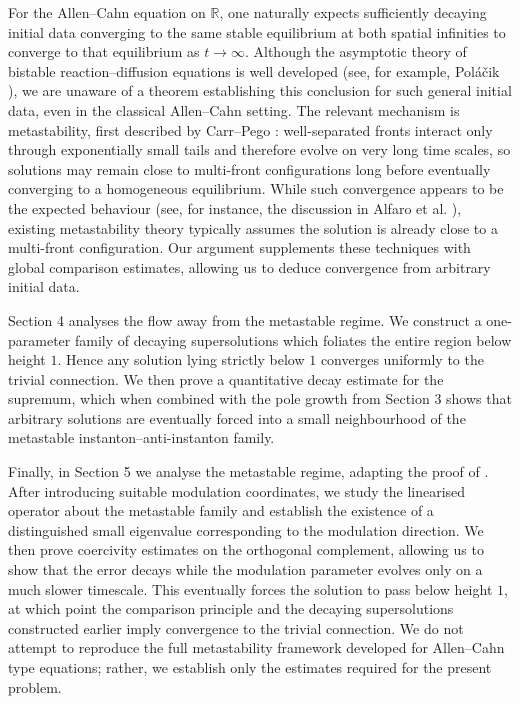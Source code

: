 \documentclass[11pt,a4paper]{article}
\numberwithin{equation}{section}
\theoremstyle{plain}
\theoremstyle{remark}
\begin{document}
For the Allen–Cahn equation on $\mathbb R$, one naturally expects sufficiently decaying initial data converging to the same stable equilibrium at both spatial infinities to converge to that equilibrium as $t\to\infty$. Although the asymptotic theory of bistable reaction–diffusion equations is well developed (see, for example, Poláčik \cite{inbook}), we are unaware of a theorem establishing this conclusion for such general initial data, even in the classical Allen–Cahn setting. The relevant mechanism is metastability, first described by Carr–Pego \cite{carr1989metastable}: well-separated fronts interact only through exponentially small tails and therefore evolve on very long time scales, so solutions may remain close to multi-front configurations long before eventually converging to a homogeneous equilibrium. While such convergence appears to be the expected behaviour (see, for instance, the discussion in Alfaro et al. \cite{Alfaro_2024}), existing metastability theory typically assumes the solution is already close to a multi-front configuration. Our argument supplements these techniques with global comparison estimates, allowing us to deduce convergence from arbitrary initial data.

Section 4 analyses the flow away from the metastable regime. We construct a one-parameter family of decaying supersolutions which foliates the entire region below height $1$. Hence any solution lying strictly below $1$ converges uniformly to the trivial connection. We then prove a quantitative decay estimate for the supremum, which when combined with the pole growth from Section 3 shows that arbitrary solutions are eventually forced into a small neighbourhood of the metastable instanton--anti-instanton family.



Finally, in Section 5 we analyse the metastable regime, adapting the proof of \cite{carr1989metastable}. After introducing suitable modulation coordinates, we study the linearised operator about the metastable family and establish the existence of a distinguished small eigenvalue corresponding to the modulation direction. We then prove coercivity estimates on the orthogonal complement, allowing us to show that the error decays while the modulation parameter evolves only on a much slower timescale. This eventually forces the solution to pass below height $1$, at which point the comparison principle and the decaying supersolutions constructed earlier imply convergence to the trivial connection. We do not attempt to reproduce the full metastability framework developed for Allen--Cahn type equations; rather, we establish only the estimates required for the present problem.
\end{document}
